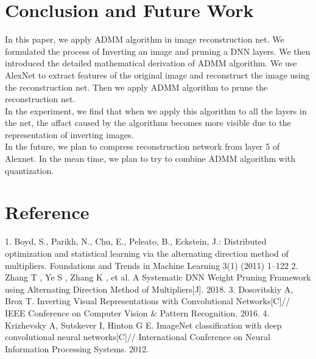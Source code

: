 \documentclass{acmtog} %
\begin{document}
\section{Conclusion and Future Work}
In this paper, we apply ADMM algorithm in image reconstruction net. We formulated the process of Inverting an image and pruning a DNN layers. We then introduced the detailed mathematical derivation of ADMM algorithm. We use AlexNet to extract features of the original image and reconstruct the image using the reconstruction net. Then we apply ADMM algorithm to prune the reconstruction net.\\
In the experiment, we find that when we apply this algorithm to all the layers in the net, the affact caused by the algorithms becomes more visible due to the representation of inverting images.\\
In the future, we plan to compress reconstruction network from layer 5 of Alexnet. In the mean time, we plan to try to combine ADMM algorithm with quantization.
\label{sec:conclusion}
%
\newpage
\appendix
\section{Reference}
\label{sec:cmds}

\begin{thebibliography}{1}
   1. Boyd, S., Parikh, N., Chu, E., Peleato, B., Eckstein, J.: Distributed optimization and statistical learning via the alternating direction method of multipliers.
  Foundations and Trends  in Machine Learning 3(1) (2011) 1–122
  2. Zhang T , Ye S , Zhang K , et al. A Systematic DNN Weight Pruning Framework using Alternating Direction Method of Multipliers[J]. 2018.
  3. Dosovitskiy A, Brox T. Inverting Visual Representations with Convolutional Networks[C]// IEEE Conference on Computer Vision \& Pattern Recognition. 2016.
  4. Krizhevsky A, Sutskever I, Hinton G E. ImageNet classification with deep convolutional neural networks[C]// International Conference on Neural Information Processing Systems. 2012.
\end{thebibliography}
\end{document}
